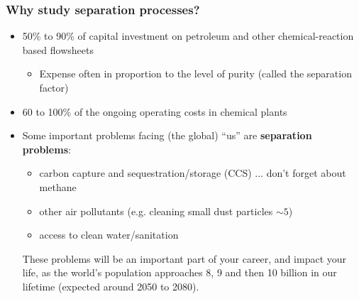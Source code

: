 \begin{frame}\frametitle{Why study separation processes?}
	\begin{itemize}
		\item	50\% to 90\% of capital investment on petroleum and other chemical-reaction based flowsheets 
		\begin{itemize}
			\item	Expense often in proportion to the level of purity (called the separation factor) 
		\end{itemize}
		\item	60 to 100\% of the ongoing operating costs in chemical plants  %
		\item	Some important problems facing (the global) ``us'' are \textbf{separation problems}:
		\begin{itemize}
			\item	carbon capture and sequestration/storage (CCS) ... don't forget about methane
			\item	other air pollutants (e.g. cleaning small dust particles $\sim 5$\micron)
			\item	access to clean water/sanitation
		\end{itemize}
		
		\begin{exampleblock}{}
			These problems will be an important part of your career, and impact your life, as the world's population approaches 8, 9 and then 10 billion in our lifetime (expected around 2050 to 2080).
		\end{exampleblock}		
		
	\end{itemize}
\end{frame}

\begin{frame}\frametitle{World population: UN projections}
	\begin{center}
		\texttt{[image: \\imagedir/teaching/\{World-Population-1800-2100.png]}}
	\end{center}
\end{frame}

